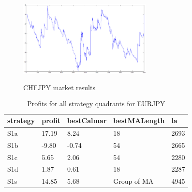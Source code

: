 \documentclass{tewiart}
\begin{document}
\begin{figure}[h]
\begin{minipage}{\linewidth}
\centering 
\includegraphics[width=0.6\textwidth]{images/chfjpyD.eps}
\label{mansard}
\end{minipage}
\caption{CHFJPY market results}
\end{figure}
\newpage
\begin{table}[!t]
\caption{Profits for all strategy quadrants for EURJPY}
 \begin{center}
 \begin{tabular}{|l|l|l|l|l|}
 \hline \textbf{strategy} & \textbf{profit} & \textbf{bestCalmar} & \textbf{bestMALength} & \textbf{la} \\ \hline
S1a & 17.19 & 8.24 & 18 & 2693\\ \hline
S1b & -9.80 & -0.74 & 54 & 2665\\ \hline
S1c & 5.65 & 2.06 & 54 & 2280\\ \hline
S1d & 1.87 & 0.61 & 18 & 2287\\ \hline
S1s & 14.85 & 5.68 & Group of MA & 4945\\
\hline \end{tabular}
 \end{center}
 \end{table}
\FloatBarrier
\end{document}
